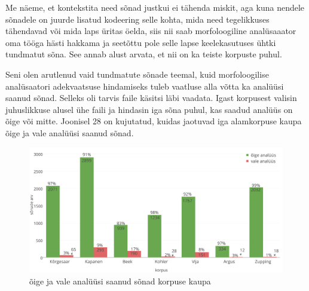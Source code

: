 \documentclass[12pt]{article}
\begin{document}
Me näeme, et kontekstita need sõnad justkui ei tähenda miskit, aga kuna nendele sõnadele on juurde lisatud kodeering selle kohta, mida need tegelikkuses tähendavad või mida laps üritas öelda, siis nii saab morfoloogiline analüsaaator oma tööga hästi hakkama ja seetõttu pole selle lapse keelekasutuses ühtki tundmatut sõna. See annab alust arvata, et nii on ka teiste korpuste puhul.

Seni olen arutlenud vaid tundmatute sõnade teemal, kuid morfoloogilise analüsaatori adekvaatsuse hindamiseks tuleb vaatluse alla võtta ka analüüsi saanud sõnad. Selleks oli tarvis faile käsitsi läbi vaadata. Igast korpusest valisin juhuslikkuse alusel ühe faili ja hindasin iga sõna puhul, kas saadud analüüs on õige või mitte. Joonisel 28 on kujutatud, kuidas jaotuvad iga alamkorpuse kaupa õige ja vale analüüsi saanud sõnad.
\hfill


\begin{figure}[H]
    \centering
    \includegraphics[width=\textwidth]{kasitsi_valed_oiged_crop}
    \caption{õige ja vale analüüsi saanud sõnad korpuse kaupa}
\end{figure}
\end{document}
